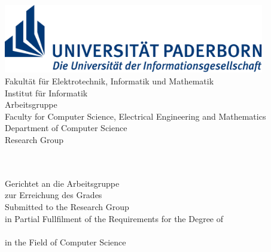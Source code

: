 \begin{titlepage}
	\begin{center}
		\begin{minipage}{135mm}
			\includegraphics[height=30mm]{figures/uni-logo}\\
			\ifgerman
				\textsf{
					\hspace*{20mm} Fakultät für Elektrotechnik,
					Informatik und Mathematik \\
					\hspace*{20mm} Institut für Informatik \\
					\hspace*{20mm} Arbeitsgruppe \theresearchgroup{} \\
				}
			\else
				\textsf{
					\hspace*{20mm} Faculty for Computer Science, 
					Electrical Engineering and Mathematics \\
					\hspace*{20mm} Department of Computer Science \\
					\hspace*{20mm} Research Group \theresearchgroup{} \\
				}
			\fi 
		\end{minipage}\\[40pt]

		{\huge \thethesistype{}}\\[5pt]
		\ifgerman
			Gerichtet an die Arbeitsgruppe \theresearchgroup{}\\
			zur Erreichung des Grades\\[5pt]
		\else
			Submitted to the \theresearchgroup{} Research Group\\
			in Partial Fullfilment of the Requirements
			for the Degree of\\[10pt]
		\fi 
		{\huge \thedegree{}}\\[7pt]
		
		in the Field of Computer Science\\[30pt]


\end{center}
\end{titlepage}
